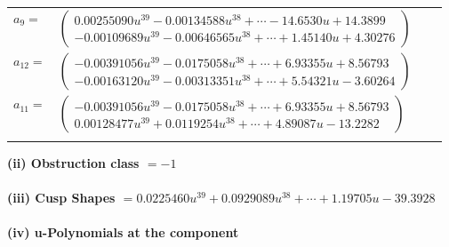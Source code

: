\documentclass[1p]{elsarticle_modified}
\theoremstyle{definition}
\begin{document}
\begin{tabular}{m{7pt} m{180pt} m{7pt} m{180pt} }
\flushright $a_{9}=$&$\begin{pmatrix}0.00255090 u^{39}-0.00134588 u^{38}+\cdots-14.6530 u+14.3899\\-0.00109689 u^{39}-0.00646565 u^{38}+\cdots+1.45140 u+4.30276\end{pmatrix}$ \\
\flushright $a_{12}=$&$\begin{pmatrix}-0.00391056 u^{39}-0.0175058 u^{38}+\cdots+6.93355 u+8.56793\\-0.00163120 u^{39}-0.00313351 u^{38}+\cdots+5.54321 u-3.60264\end{pmatrix}$ \\
\flushright $a_{11}=$&$\begin{pmatrix}-0.00391056 u^{39}-0.0175058 u^{38}+\cdots+6.93355 u+8.56793\\0.00128477 u^{39}+0.0119254 u^{38}+\cdots+4.89087 u-13.2282\end{pmatrix}$\\&\end{tabular}
\flushleft \textbf{(ii) Obstruction class $= -1$}\\~\\
\flushleft \textbf{(iii) Cusp Shapes $= 0.0225460 u^{39}+0.0929089 u^{38}+\cdots+1.19705 u-39.3928$}\\~\\
\newpage\renewcommand{\arraystretch}{1}
\flushleft \textbf{(iv) u-Polynomials at the component}\newline \\
\end{document}
